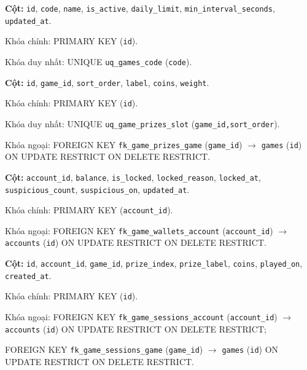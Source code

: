 \begin{description}[leftmargin=3.6cm,labelwidth=3.4cm,style=nextline]

\item[\texttt{games}] \textbf{Cột:} \texttt{id}, \texttt{code}, \texttt{name}, \texttt{is\_active}, \texttt{daily\_limit}, \texttt{min\_interval\_seconds}, \texttt{updated\_at}.

Khóa chính: PRIMARY KEY (\texttt{id}).

Khóa duy nhất: UNIQUE \texttt{uq\_games\_code} (\texttt{code}).

\item[\texttt{game\_prizes}] \textbf{Cột:} \texttt{id}, \texttt{game\_id}, \texttt{sort\_order}, \texttt{label}, \texttt{coins}, \texttt{weight}.

Khóa chính: PRIMARY KEY (\texttt{id}).

Khóa duy nhất: UNIQUE \texttt{uq\_game\_prizes\_slot} (\texttt{game\_id,sort\_order}).

Khóa ngoại: FOREIGN KEY \texttt{fk\_game\_prizes\_game} (\texttt{game\_id}) $\rightarrow$ \texttt{games} (\texttt{id}) ON UPDATE RESTRICT ON DELETE RESTRICT.

\item[\texttt{game\_wallets}] \textbf{Cột:} \texttt{account\_id}, \texttt{balance}, \texttt{is\_locked}, \texttt{locked\_reason}, \texttt{locked\_at}, \texttt{suspicious\_count}, \texttt{suspicious\_on}, \texttt{updated\_at}.

Khóa chính: PRIMARY KEY (\texttt{account\_id}).

Khóa ngoại: FOREIGN KEY \texttt{fk\_game\_wallets\_account} (\texttt{account\_id}) $\rightarrow$ \texttt{accounts} (\texttt{id}) ON UPDATE RESTRICT ON DELETE RESTRICT.

\item[\texttt{game\_sessions}] \textbf{Cột:} \texttt{id}, \texttt{account\_id}, \texttt{game\_id}, \texttt{prize\_index}, \texttt{prize\_label}, \texttt{coins}, \texttt{played\_on}, \texttt{created\_at}.

Khóa chính: PRIMARY KEY (\texttt{id}).

Khóa ngoại: FOREIGN KEY \texttt{fk\_game\_sessions\_account} (\texttt{account\_id}) $\rightarrow$ \texttt{accounts} (\texttt{id}) ON UPDATE RESTRICT ON DELETE RESTRICT;\par FOREIGN KEY \texttt{fk\_game\_sessions\_game} (\texttt{game\_id}) $\rightarrow$ \texttt{games} (\texttt{id}) ON UPDATE RESTRICT ON DELETE RESTRICT.


\end{description}
